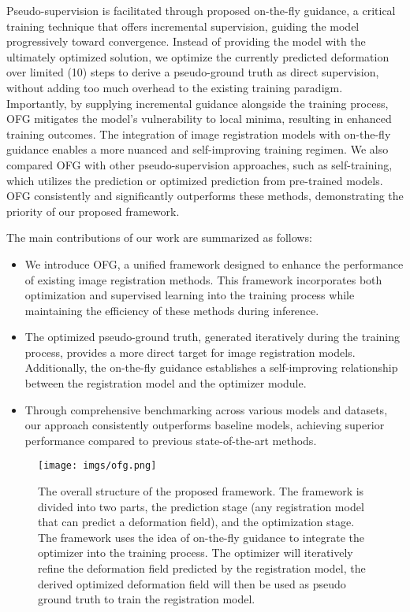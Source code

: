 \documentclass[10pt,twocolumn,letterpaper]{article}
\begin{document}
Pseudo-supervision is facilitated through proposed on-the-fly guidance, a critical training technique that offers incremental supervision, guiding the model progressively toward convergence. Instead of providing the model with the ultimately optimized solution, we optimize the currently predicted deformation over limited (10) steps to derive a pseudo-ground truth as direct supervision, without adding too much overhead to the existing training paradigm. Importantly, by supplying incremental guidance alongside the training process, OFG mitigates the model's vulnerability to local minima, resulting in enhanced training outcomes. The integration of image registration models with on-the-fly guidance enables a more nuanced and self-improving training regimen. We also compared OFG with other pseudo-supervision approaches, such as self-training, which utilizes the prediction or optimized prediction from pre-trained models. OFG consistently and significantly outperforms these methods, demonstrating the priority of our proposed framework.

The main contributions of our work are summarized as follows:
\begin{itemize}
    \item We introduce OFG, a unified framework designed to enhance the performance of existing image registration methods. This framework incorporates both optimization and supervised learning into the training process while maintaining the efficiency of these methods during inference.
    \item The optimized pseudo-ground truth, generated iteratively during the training process, provides a more direct target for image registration models. Additionally, the on-the-fly guidance establishes a self-improving relationship between the registration model and the optimizer module.
    \item Through comprehensive benchmarking across various models and datasets, our approach consistently outperforms baseline models, achieving superior performance compared to previous state-of-the-art methods.
\end{itemize}

 \begin{figure*}
    \begin{center}
      \texttt{[image: imgs/ofg.png]}
    \end{center}
    \caption{The overall structure of the proposed framework. The framework is divided into two parts, the prediction stage (any registration model that can predict a deformation field), and the optimization stage. The framework uses the idea of on-the-fly guidance to integrate the optimizer into the training process. The optimizer will iteratively refine the deformation field predicted by the registration model, the derived optimized deformation field will then be used as pseudo ground truth to train the registration model.}
    \label{fig:overall architecture}
\end{figure*}
\end{document}
